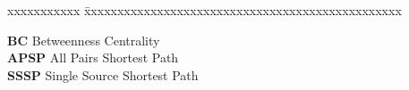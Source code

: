 \abbreviations
\noindent 
\begin{tabbing}
xxxxxxxxxxx \= xxxxxxxxxxxxxxxxxxxxxxxxxxxxxxxxxxxxxxxxxxxxxxxx \kill

\textbf{BC} \> Betweenness Centrality \\
\textbf{APSP} \> All Pairs Shortest Path \\
\textbf{SSSP} \> Single Source Shortest Path \\



\end{tabbing}
 
